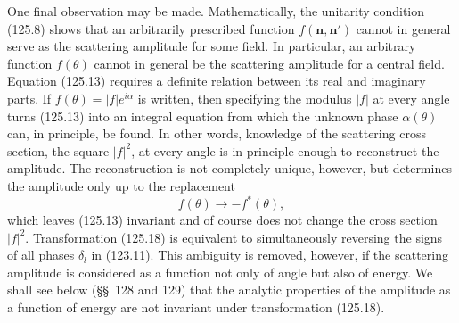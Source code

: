 One final observation may be made. Mathematically, the unitarity condition (125.8) shows that an arbitrarily prescribed function $f(\mathbf n,\mathbf n')$ cannot in general serve as the scattering amplitude for some field. In particular, an arbitrary function $f(\theta)$ cannot in general be the scattering amplitude for a central field. Equation (125.13) requires a definite relation between its real and imaginary parts. If $f(\theta)=|f|e^{i\alpha}$ is written, then specifying the modulus $|f|$ at every angle turns (125.13) into an integral equation from which the unknown phase $\alpha(\theta)$ can, in principle, be found. In other words, knowledge of the scattering cross section, the square $|f|^2$, at every angle is in principle enough to reconstruct the amplitude. The reconstruction is not completely unique, however, but determines the amplitude only up to the replacement
\begin{equation}
 f(\theta)\to-f^*(\theta),
 \tag{125.18}
\end{equation}
which leaves (125.13) invariant and of course does not change the cross section $|f|^2$. Transformation (125.18) is equivalent to simultaneously reversing the signs of all phases $\delta_l$ in (123.11). This ambiguity is removed, however, if the scattering amplitude is considered as a function not only of angle but also of energy. We shall see below (§§~128 and 129) that the analytic properties of the amplitude as a function of energy are not invariant under transformation (125.18).
